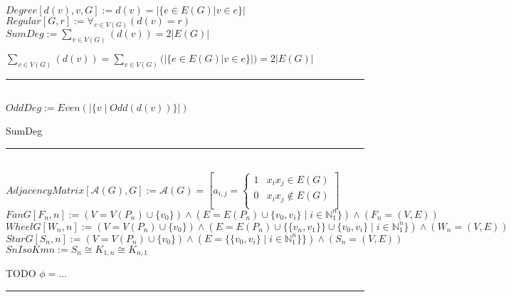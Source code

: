 \documentclass{book}
\newcommand{\abr}{:=}
\newcommand{\st}{\mathbin{|}}
\newcommand{\utup}[1]{\{#1\}}
\begin{document}



$Degree[d(v), v, G] \abr d(v) = |\{e \in E(G) | v \in e\}|$ \\
$Regular[G, r] \abr \forall_{v \in V(G)}(d(v) = r)$ \\

$SumDeg \abr \sum \limits_{v \in V(G)}(d(v)) = 2 |E(G)|$ \\
\begin{enumerate}
  \lit $\sum \limits_{v \in V(G)}(d(v)) = \sum \limits_{v \in V(G)}(|\{e \in E(G) | v \in e\}|) = 2 |E(G)|$ \\
\end{enumerate} \vspace{.75mm} \hrule \vspace{.75mm} \ \\

$OddDeg \abr Even(|\{v \st Odd(d(v))\}|)$ \\
\begin{enumerate}
  \lit SumDeg
\end{enumerate} \vspace{.75mm} \hrule \vspace{.75mm} \ \\

$AdjacencyMatrix[\mathcal{A}(G), G] \abr \mathcal{A}(G) = \left[a_{i, j} = 
\begin{cases} 
  1 & x_i x_j \in E(G) \\
  0 &  x_i x_j \notin E(G) \\
\end{cases}\right]$ \\


$FanG[F_n, n] \abr (V = V(P_n) \cup \{v_0\}) \land (E = E(P_n) \cup \utup{v_0, v_i} \st i \in \mathbb{N}_1^n\}) \land (F_n = (V, E))$ \\
$WheelG[W_n, n] \abr (V = V(P_n) \cup \{v_0\}) \land (E = E(P_n) \cup \{\utup{v_n, v_1}\} \cup \utup{v_0, v_i} \st i \in \mathbb{N}_1^n\}) \land (W_n = (V, E))$ \\
$StarG[S_n, n] \abr (V = V(P_n) \cup \{v_0\}) \land (E = \{\utup{v_0, v_i} \st i \in \mathbb{N}_1^n\}\}) \land (S_n = (V, E))$ \\


$SnIsoKmn \abr S_n \cong K_{1, n} \cong K_{n, 1}$
\begin{enumerate}
  \lit TODO $\phi = \ldots$
\end{enumerate} \vspace{.75mm} \hrule \vspace{.75mm} \ \\
\end{document}
